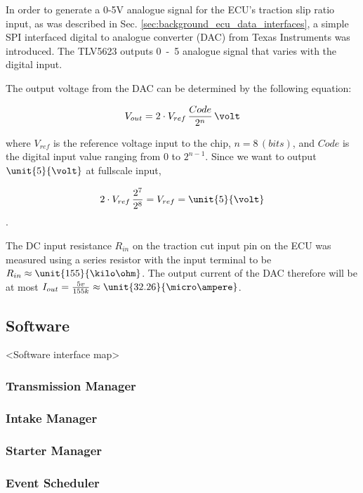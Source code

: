 In order to generate a 0-5V analogue signal for the ECU's traction slip ratio input, as was described in Sec. \ref{sec:background_ecu_data_interfaces}, a simple SPI interfaced digital to analogue converter (DAC) from Texas Instruments was introduced. The TLV5623 outputs \unit{0-5}{\volt} analogue signal that varies with the digital input.

The output voltage from the DAC can be determined by the following equation:

\begin{equation}
V_{out}=2\cdot{V_{ref}}\,\frac{Code}{2^{n}}\,\volt
\end{equation}

where $V_{ref}$ is the reference voltage input to the chip, $n=8\,(bits)$, and $Code$ is the digital input value ranging from $0$ to $2^{n-1}$. Since we want to output $\unit{5}{\volt}$ at fullscale input,

\begin{equation}
2\cdot{V_{ref}}\,\frac{2^{7}}{2^{8}}=V_{ref}=\unit{5}{\volt}
\end{equation}.

The DC input resistance $R_{in}$ on the traction cut input pin on the ECU was measured using a series resistor with the input terminal to be $R_{in}\approx\unit{155}{\kilo\ohm}$. The output current of the DAC therefore will be at most $I_{out}=\frac{5v}{155k}\approx\unit{32.26}{\micro\ampere}$.

\subsection{Software}

<Software interface map>


\subsubsection{Transmission Manager}


\subsubsection{Intake Manager}


\subsubsection{Starter Manager}


\subsubsection{Event Scheduler}



